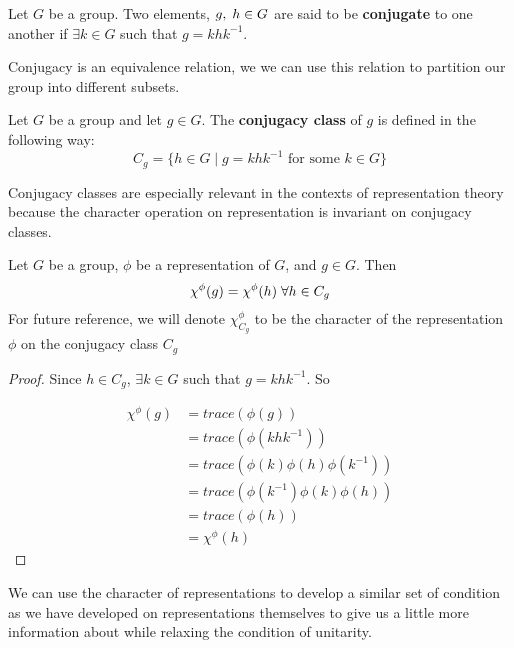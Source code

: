\begin{definition}
	Let $G$ be a group. Two elements, $g,\hspace{1mm}h \in G$ are said to be \textbf{conjugate} to one another if $\exists k \in G$ such that $g = khk^{-1}$.
\end{definition}

Conjugacy is an equivalence relation, we we can use this relation to partition our group into different subsets.

\begin{definition}
	Let $G$ be a group and let $g \in G$. The \textbf{conjugacy class} of $g$ is defined in the following way:
$$C_g = \{h\in G \mid g = khk^{-1} \text{ for some } k \in G \}$$
\end{definition}

Conjugacy classes are especially relevant in the contexts of representation theory because the character operation on representation is invariant on conjugacy classes.

\begin{theorem}
	Let $G$ be a group, $\phi$ be a representation of $G$, and $g\in G$. Then 
$$\chi^\phi(g) = \chi^\phi(h) \hspace{1mm}\forall h \in C_g$$
For future reference, we will denote $\chi^\phi_{C_g}$ to be the character of the representation $\phi$ on the conjugacy class $C_g$
\end{theorem}
\begin{proof}\cite{Mendes}  Since $h\in C_g$, $\exists k\in G$ such that $g = khk^{-1}$. So 

\begin{equation}
	\begin{aligned}
		\chi^\phi(g) &= trace(\phi(g)) \\
					&= trace(\phi(khk^{-1}))\\ 
					&= trace(\phi(k)\phi(h)\phi(k^{-1})) \\
					&= trace(\phi(k^{-1})\phi(k)\phi(h)) \\
					&= trace(\phi(h)) \\
					&= \chi^\phi(h) 
	\end{aligned}
\end{equation}
\end{proof}

We can use the character of representations to develop a similar set of condition as we have developed on representations themselves to give us a little more information about while relaxing the condition of unitarity.

